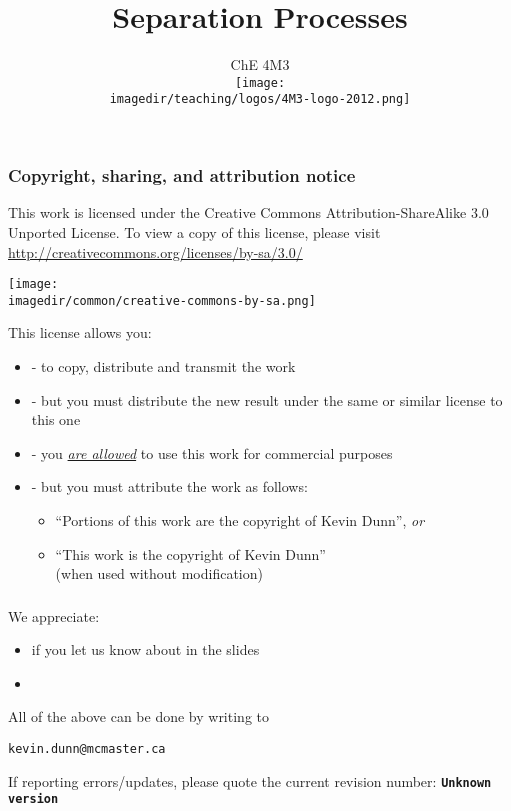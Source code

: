 \documentclass[11pt]{beamer}
\title[]{\LARGE Separation Processes}
\subtitle[]{\Large ChE 4M3 \\ \vspace{0.5cm} \texttt{[image: \\imagedir/teaching/logos/4M3-logo-2012.png]} \vspace{-1.5cm} }\author[]{}
\institute[]{}
\date[]{\copyright~ Kevin Dunn, \today \\ \vspace{1cm}{\footnotesize {\tt kevin.dunn@mcmaster.ca}\\ \href{http://learnche.mcmaster.ca/4M3}{http://learnche.mcmaster.ca/4M3}\\ \vspace{1cm}}

{\footnotesize Overall revision number: \hgversion (\monthname~\THEYEAR)} %
}
\newcommand{\hgversion}{Unknown version}
\begin{document}
	
\begin{frame} \titlepage \end{frame}

\begin{frame}\frametitle{Copyright, sharing, and attribution notice}

	{\footnotesize This work is licensed under the Creative Commons Attribution-ShareAlike 3.0 Unported License. To view a copy of this license, 
	please visit \href{http://creativecommons.org/licenses/by-sa/3.0/}{http://creativecommons.org/licenses/by-sa/3.0/}}
	\vspace{-1.0cm}
	\begin{flushright}
		\texttt{[image: \\imagedir/common/creative-commons-by-sa.png]}
	\end{flushright}	
	\vspace{-0.2cm}
	\begin{exampleblock}{}
		{\small This license allows you: }
		\begin{itemize}
			\item	{} - to copy, distribute and transmit the work
			\item	{} - but you must distribute the new result under the same or similar license to this one
			\item	{} - you \underline{\emph{are allowed}} to use this work for commercial purposes 
			\item	{} - but you must attribute the work as follows:
			\begin{itemize}
				\item	``Portions of this work are the copyright of Kevin Dunn'', \emph{or}
				\item	``This work is the copyright of Kevin Dunn'' \\{\tiny (when used without modification)}
			\end{itemize} 
		\end{itemize}
	\end{exampleblock}
\end{frame}

\begin{frame}\frametitle{}
	We appreciate:
	\begin{itemize}
		\item	if you let us know about {} in the slides
		\item	{}
	\end{itemize}
	\vskip24pt
	All of the above can be done by writing to
	\begin{exampleblock}{}
		\begin{center}
			{\Large \tt kevin.dunn@mcmaster.ca}
		\end{center}
	\end{exampleblock}
	\vskip12pt
	{\scriptsize If reporting errors/updates, please quote the current revision number: \textbf{\tt \hgversion}}
\end{frame}


\end{document}
